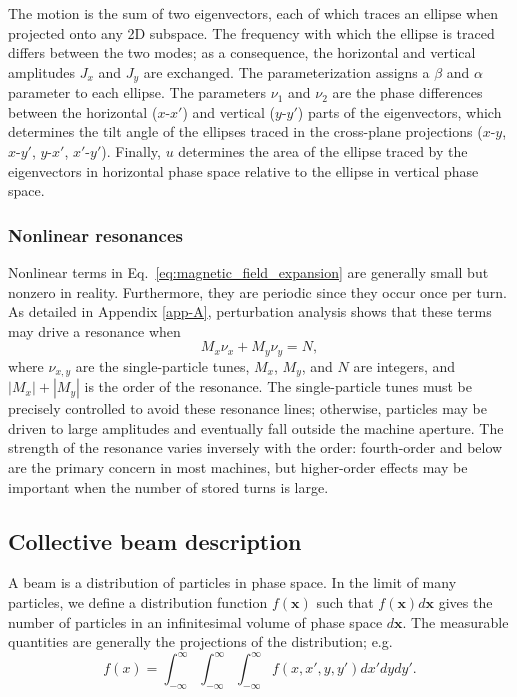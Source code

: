 %
The motion is the sum of two eigenvectors, each of which traces an ellipse when projected onto any 2D subspace. The frequency with which the ellipse is traced differs between the two modes; as a consequence, the horizontal and vertical amplitudes $J_x$ and $J_y$ are exchanged. The parameterization assigns a $\beta$ and $\alpha$ parameter to each ellipse. The parameters $\nu_1$ and $\nu_2$ are the phase differences between the horizontal ($x$-$x'$) and vertical ($y$-$y'$) parts of the eigenvectors, which determines the tilt angle of the ellipses traced in the cross-plane projections ($x$-$y$, $x$-$y'$, $y$-$x'$, $x'$-$y'$). Finally, $u$ determines the area of the ellipse traced by the eigenvectors in horizontal phase space relative to the ellipse in vertical phase space. 


\subsubsection{Nonlinear resonances}

Nonlinear terms in Eq.~\eqref{eq:magnetic_field_expansion} are generally small but nonzero in reality. Furthermore, they are periodic since they occur once per turn. As detailed in Appendix \ref{app-A}, perturbation analysis shows that these terms may drive a resonance when 
%
\begin{equation}\label{eq:resonance_lines}
    M_x \nu_x + M_y \nu_y = N,
\end{equation}
%
where $\nu_{x, y}$ are the single-particle tunes, $M_x$, $M_y$, and $N$ are integers, and $|M_x| + |M_y|$ is the order of the resonance. The single-particle tunes must be precisely controlled to avoid these resonance lines; otherwise, particles may be driven to large amplitudes and eventually fall outside the machine aperture. The strength of the resonance varies inversely with the order: fourth-order and below are the primary concern in most machines, but higher-order effects may be important when the number of stored turns is large. 



\subsection{Collective beam description}

A beam is a distribution of particles in phase space. In the limit of many particles, we define a distribution function $f(\mathbf{x})$ such that $f(\mathbf{x}) d\mathbf{x}$ gives the number of particles in an infinitesimal volume of phase space $d\mathbf{x}$. The measurable quantities are generally the projections of the distribution; e.g.
%
\begin{equation}
    f(x) = \int_{-\infty}^{\infty}\int_{-\infty}^{\infty}\int_{-\infty}^{\infty} f(x, x', y, y') dx' dy dy'.
\end{equation}
%

